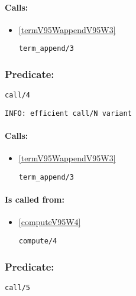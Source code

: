 \paragraph{Calls:} 
\begin{itemize}
\item \ref{termV95WappendV95W3} 
\begin{verbatim}
term_append/3
\end{verbatim}

\end{itemize}

\subsubsection{Predicate:} \label{callV95W4}

\begin{verbatim}
call/4
\end{verbatim}

{\small \begin{verbatim}
INFO: efficient call/N variant

\end{verbatim}}
\paragraph{Calls:} 
\begin{itemize}
\item \ref{termV95WappendV95W3} 
\begin{verbatim}
term_append/3
\end{verbatim}

\end{itemize}
\paragraph{Is called from:} 
\begin{itemize}
\item \ref{computeV95W4} 
\begin{verbatim}
compute/4
\end{verbatim}

\end{itemize}

\subsubsection{Predicate:} \label{callV95W5}

\begin{verbatim}
call/5
\end{verbatim}

